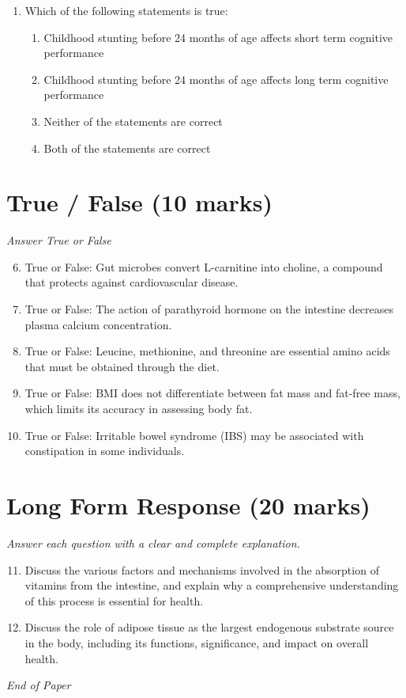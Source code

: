 \documentclass[12pt]{article}
\begin{document}
\begin{enumerate}[label=\arabic*.]
\begin{enumerate}[label=(\alph*)]
    \item Parietal cells secrete pepsinogen, the inactive precursor of pepsin
    \item G Cells secrete hydrochloric acid
\end{enumerate}
\item Which of the following statements is true:
\begin{enumerate}[label=(\alph*)]
    \item Childhood stunting before 24 months of age affects short term cognitive performance
    \item Childhood stunting before 24 months of age affects long term cognitive performance
    \item Neither of the statements are correct
    \item Both of the statements are correct
\end{enumerate}
\end{enumerate}

\section*{True / False (10 marks)}
\textit{Answer True or False}
\begin{enumerate}[label=\arabic*.]
\setcounter{enumi}{5}
\item True or False: Gut microbes convert L-carnitine into choline, a compound that protects against cardiovascular disease.
\item True or False: The action of parathyroid hormone on the intestine decreases plasma calcium concentration.
\item True or False: Leucine, methionine, and threonine are essential amino acids that must be obtained through the diet.
\item True or False: BMI does not differentiate between fat mass and fat-free mass, which limits its accuracy in assessing body fat.
\item True or False: Irritable bowel syndrome (IBS) may be associated with constipation in some individuals.
\end{enumerate}

\section*{Long Form Response (20 marks)}
\textit{Answer each question with a clear and complete explanation.}
\begin{enumerate}[label=\arabic*.]
\setcounter{enumi}{10}
\item Discuss the various factors and mechanisms involved in the absorption of vitamins from the intestine, and explain why a comprehensive understanding of this process is essential for health.
\item Discuss the role of adipose tissue as the largest endogenous substrate source in the body, including its functions, significance, and impact on overall health.
\end{enumerate}

\vfill
\noindent\textit{End of Paper}
\end{document}
